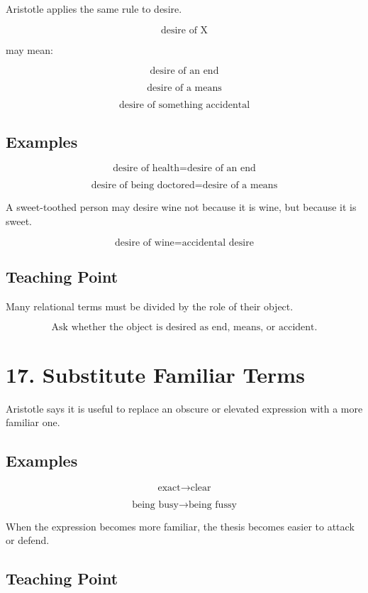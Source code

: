 \documentclass[12pt]{article}
\begin{document}
Aristotle applies the same rule to desire.

\[
\text{desire of X}
\]

may mean:

\[
\text{desire of an end}
\]

\[
\text{desire of a means}
\]

\[
\text{desire of something accidental}
\]

\subsection*{Examples}

\[
\text{desire of health} = \text{desire of an end}
\]

\[
\text{desire of being doctored} = \text{desire of a means}
\]

A sweet-toothed person may desire wine not because it is wine, but because it
is sweet.

\[
\text{desire of wine} = \text{accidental desire}
\]

\subsection*{Teaching Point}

Many relational terms must be divided by the role of their object.

\[
\boxed{
\text{Ask whether the object is desired as end, means, or accident.}
}
\]

\section*{17. Substitute Familiar Terms}

Aristotle says it is useful to replace an obscure or elevated expression with a
more familiar one.

\subsection*{Examples}

\[
\text{exact} \rightarrow \text{clear}
\]

\[
\text{being busy} \rightarrow \text{being fussy}
\]

When the expression becomes more familiar, the thesis becomes easier to attack
or defend.

\subsection*{Teaching Point}
\end{document}
